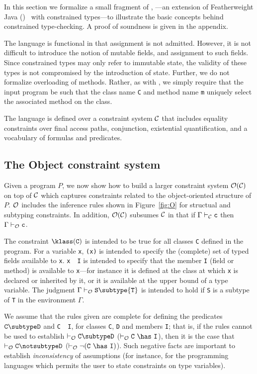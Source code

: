 In this section we formalize a small fragment of \Xten{}, \CFJ---an
extension of Featherweight Java (\FJ{})~\cite{FJ} with
constrained types---to illustrate the basic concepts behind
constrained type-checking.  A proof of soundness is given in the
appendix.

The language is functional in that assignment is not admitted.
However, it is not difficult to introduce the notion of mutable
fields, and assignment to such fields. Since constrained types
may only refer to immutable state, the validity of these types
is not compromised by the introduction of state.
%
Further, we do not formalize overloading of methods. Rather, as
with \FJ{}, we simply require that the input program be such
that the class name {\tt C} and method name {\tt m} uniquely
select the associated method on the class.

The language is defined over a constraint system $\cal C$
that includes equality constraints over final access paths,
conjunction, existential quantification, and a vocabulary of
formulas and predicates.

\subsection{The Object constraint system}\label{sec:O}

\newcommand\vdashO{\vdash_{\cal O}}

Given a program $P$, we now show how to build a larger
constraint system ${\cal O}({\cal C})$
on top of $\cal C$ which
captures constraints related to the object-oriented structure of
$P$.
$\cal O$ includes the inference rules shown in
Figure~\ref{fig:O} for structual and subtyping constraints.
In addition,
$\cal O(\cal C)$ subsumes $\cal C$ in that if
$\Gamma \vdash_{\cal C} {\tt c}$
then
$\Gamma \vdash_{\cal O} {\tt c}$.

The constraint $\klass({\tt C})$ is intended to be true for all
classes {\tt C} defined in the program.  
For a
variable {\tt x}, {\tt \fields({\tt x})} is intended to specify the
(complete) set of typed fields available to {\tt x}.  {\tt x}~\has~{\tt I}
is intended to specify that the member {\tt I} (field or method) is
available to {\tt x}---for instance it is defined at the class at
which {\tt x} is declared or inherited by it, or it is available at
the upper bound of a type variable.
%
The judgment 
$\Gamma \vdashO {\tt S} \subtype {\tt T}$
is intended to hold if {\tt S} is a subtype of {\tt T} in the
environment $\Gamma$.

We assume that the rules given are complete for
defining the predicates $\tt C \subtype D$ and {\tt C\ \has\ I}, for
classes {\tt C}, {\tt D} and members {\tt I}; that is, if the rules
cannot be used to establish $\tt \vdashO C \subtype D$ ($\tt
\vdashO C\ \has\ I$), then it is the case that $\tt
\vdashO C \notsubtype D$ ($\tt \vdashO \neg (C\ \has\ I)$).
%
Such negative facts are important to establish {\em inconsistency} of
assumptions (for instance, for the programming languages which permits
the user to state constraints on type variables).  

